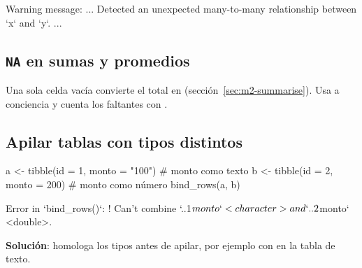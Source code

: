 \begin{rsalida}
Warning message:
...
  Detected an unexpected many-to-many relationship between `x` and `y`.
...
\end{rsalida}

\subsection{\texttt{NA} en sumas y promedios}

Una sola celda vacía convierte el total en 
(sección~\ref{sec:m2-summarise}). Usa  a conciencia
y cuenta los faltantes con .

\subsection{Apilar tablas con tipos distintos}

\begin{rnoejecutar}
a <- tibble(id = 1, monto = "100")    # monto como texto
b <- tibble(id = 2, monto = 200)      # monto como número
bind_rows(a, b)
\end{rnoejecutar}
\begin{rsalida}
Error in `bind_rows()`:
! Can't combine `..1$monto` <character> and `..2$monto` <double>.
\end{rsalida}

{\sloppy \textbf{Solución}: homologa los tipos antes de apilar, por ejemplo con
 en la tabla de texto.\par}

